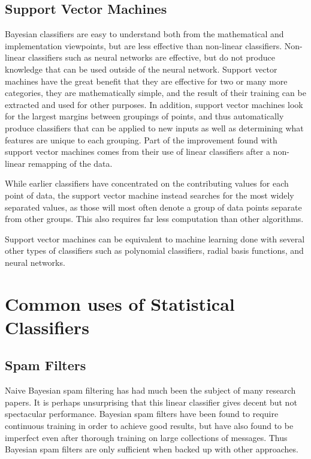 \documentclass[12pt]{article}
\begin{document}
\subsection{Support Vector Machines}
Bayesian classifiers are easy to understand both from the mathematical and implementation viewpoints, but are
less effective than non-linear classifiers. Non-linear classifiers such as neural networks are effective, but
do not produce knowledge that can be used outside of the neural network.  Support vector machines have the
great benefit that they are effective for two or many more categories, they are mathematically simple, and the
result of their training can be extracted and used for other purposes. \citep{hearst1998support} In addition,
support vector machines look for the largest margins between groupings of points, and thus automatically
produce classifiers that can be applied to new inputs as well as determining what features are unique to each
grouping. Part of the improvement found with support vector machines comes from their use of linear
classifiers after a non-linear remapping of the data. \citep{cortes1995support}

While earlier classifiers have concentrated on the contributing values for each point of data, the support
vector machine instead searches for the most widely separated values, as those will most often denote a group
of data points separate from other groups. This also requires far less computation than other algorithms.

Support vector machines can be equivalent to machine learning done with several other types of classifiers
such as polynomial classifiers, radial basis functions, and neural networks. \citep{hearst1998support}


\section{Common uses of Statistical Classifiers}
\subsection{Spam Filters}
Naive Bayesian spam filtering has had much been the subject of many research papers. It is perhaps
unsurprising that this linear classifier gives decent but not spectacular performance.  Bayesian spam filters
have been found to require continuous training in order to achieve good results, but have also found to be
imperfect even after thorough training on large collections of messages. Thus Bayesian spam filters are only
sufficient when backed up with other approaches.  \citep{androutsopoulos2000evaluation}
\end{document}
